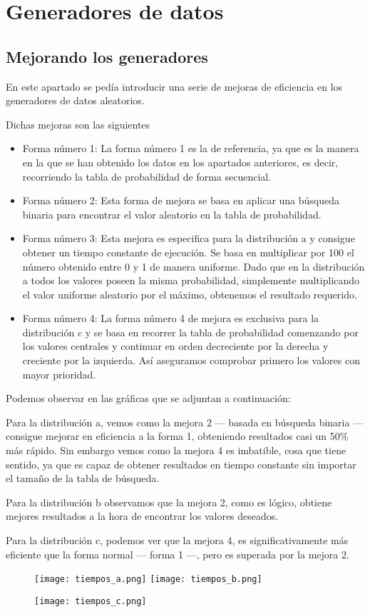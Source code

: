 \chapter{Generadores de datos}

\section{Mejorando los generadores}

En este apartado se pedía introducir una serie de mejoras de eficiencia en los generadores de datos aleatorios.

Dichas mejoras son las siguientes

\begin{itemize}
	\item Forma número 1: La forma número 1 es la de referencia, ya que es la manera en la que se han obtenido los datos en los apartados anteriores, es decir, recorriendo la tabla de probabilidad de forma secuencial.
	\item Forma número 2: Esta forma de mejora se basa en aplicar una búsqueda binaria para encontrar el valor aleatorio en la tabla de probabilidad.
	\item Forma número 3: Esta mejora es especifica para la distribución a y consigue obtener un tiempo constante de ejecución. Se basa en multiplicar por 100 el número obtenido entre 0 y 1 de manera uniforme. Dado que en la distribución a todos los valores poseen la misma probabilidad, simplemente multiplicando el valor uniforme aleatorio por el máximo, obtenemos el resultado requerido.
	\item Forma número 4: La forma número 4 de mejora es exclusiva para la distribución c y se basa en recorrer la tabla de probabilidad comenzando por los valores centrales y continuar en orden decreciente por la derecha y creciente por la izquierda. Así aseguramos comprobar primero los valores con mayor prioridad.
\end{itemize}

Podemos observar en las gráficas que se adjuntan a continuación:

Para la distribución a, vemos como la mejora 2 --- basada en búsqueda binaria --- consigue mejorar en eficiencia a la forma 1, obteniendo resultados casi un 50\% más rápido. Sin embargo vemos como la mejora 4 es imbatible, cosa que tiene sentido, ya que es capaz de obtener resultados en tiempo constante sin importar el tamaño de la tabla de búsqueda.

Para la distribución b observamos que la mejora 2, como es lógico, obtiene mejores resultados a la hora de encontrar los valores deseados.

Para la distribución c, podemos ver que la mejora 4, es significativamente más eficiente que la forma normal --- forma 1 ---, pero es superada por la mejora 2.

\begin{figure}[H]
	\centering
	\texttt{[image: tiempos\_a.png]}
	\texttt{[image: tiempos\_b.png]}
\end{figure}
\begin{figure}[H]
	\centering
	\texttt{[image: tiempos\_c.png]}
\end{figure}


\newpage
